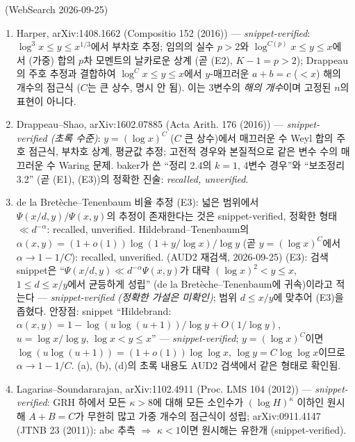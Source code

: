 \begin{theorem}[외부 입력의 상태]\label{STRUCT:ext-smooth-lit}
\EXT\ (WebSearch 2026-09-25)
\begin{enumerate}[label=(\alph*)]
\item Harper, arXiv:1408.1662 (Compositio 152 (2016)) — \emph{snippet-verified}: $\log^3x\le y\le x^{1/3}$에서 부차호 추정; 임의의 실수 $p>2$와 $\log^{C(p)}x\le y\le x$에서 (가중) 합의 $p$차 모멘트의 날카로운 상계 (곧 (E2), $K-1=p>2$); Drappeau의 주호 추정과 결합하여 $\log^Cx\le y\le x$에서 $y$-매끄러운 $a+b=c$ ($<x$) 해의 개수의 점근식 ($C$는 큰 상수, 명시 안 됨). 이는 3변수의 \emph{해의 개수}이며 고정된 $n$의 표현이 아니다.
\item Drappeau--Shao, arXiv:1602.07885 (Acta Arith. 176 (2016)) — \emph{snippet-verified (초록 수준)}: $y=(\log x)^C$ ($C$ 큰 상수)에서 매끄러운 수 Weyl 합의 주호 점근식, 부차호 상계, 평균값 추정; 고전적 경우와 본질적으로 같은 변수 수의 매끄러운 수 Waring 문제. baker가 쓴 ``정리 2.4의 $k=1$, 4변수 경우''와 ``보조정리 3.2'' (곧 (E1), (E3))의 정확한 진술: \emph{recalled, unverified}.
\item de la Bretèche--Tenenbaum 비율 추정 (E3): 넓은 범위에서 $\Psi(x/d,y)/\Psi(x,y)$의 추정이 존재한다는 것은 snippet-verified, 정확한 형태 $\ll d^{-\alpha}$: recalled, unverified. Hildebrand--Tenenbaum의 $\alpha(x,y)=(1+o(1))\log(1+y/\log x)/\log y$ (곧 $y=(\log x)^C$에서 $\alpha\to1-1/C$): recalled, unverified.
(AUD2 재검색, 2026-09-25) (E3): 검색 snippet은 ``$\Psi(x/d,y)\ll d^{-\alpha}\Psi(x,y)$가 대략 $(\log x)^2<y\le x$, $1\le d\le x/y$에서 균등하게 성립'' (de la Bretèche--Tenenbaum에 귀속)이라고 적는다 --- \emph{snippet-verified (정확한 가설은 미확인)}; 범위 $d\le x/y$에 맞추어 (E3)을 좁혔다. 안장점: snippet ``Hildebrand: $\alpha(x,y)=1-\log(u\log(u+1))/\log y+O(1/\log y)$, $u=\log x/\log y$, $\log x<y\le x$'' --- \emph{snippet-verified}; $y=(\log x)^C$이면 $\log(u\log(u+1))=(1+o(1))\log\log x$, $\log y=C\log\log x$이므로 $\alpha\to1-1/C$. (a), (b), (d)의 초록 내용도 AUD2 검색에서 같은 형태로 확인됨.
\item Lagarias--Soundararajan, arXiv:1102.4911 (Proc. LMS 104 (2012)) — \emph{snippet-verified}: GRH 하에서 모든 $\kappa>8$에 대해 모든 소인수가 $(\log H)^\kappa$ 이하인 원시해 $A+B=C$가 무한히 많고 가중 개수의 점근식이 성립; arXiv:0911.4147 (JTNB 23 (2011)): abc 추측 $\Rightarrow$ $\kappa<1$이면 원시해는 유한개 (snippet-verified).
\end{enumerate}
\end{theorem}

